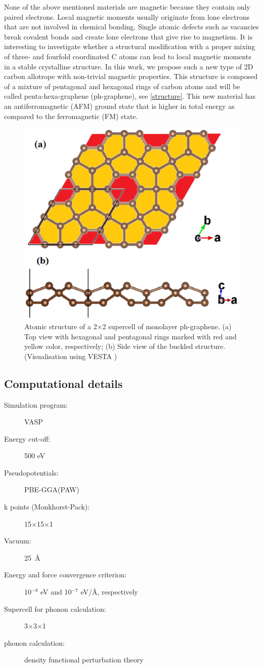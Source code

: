 None of the above mentioned materials are magnetic because they contain only paired electrons. Local magnetic moments usually originate from lone electrons that are not involved in chemical bonding. Single atomic defects such as vacancies break covalent bonds and create lone electrons that give rise to magnetism. It is interesting to investigate whether a structural modification with a proper mixing of three- and fourfold coordinated C atoms can lead to local magnetic moments in a stable crystalline structure.  In this work, we propose such a new type of 2D carbon allotrope with non-trivial magnetic properties. This structure is composed of a mixture of pentagonal and hexagonal rings of carbon atoms and will be called penta-hexa-graphene (ph-graphene), see \autoref{structure}. This new material has an antiferromagnetic (AFM) ground state that is higher in total energy as compared to the ferromagnetic (FM) state.

\begin{figure}[htbp]
\centering
\includegraphics[width=0.6\linewidth]{PG_structure.eps}%
\caption{ Atomic structure of a 2$\times$2 supercell of monolayer ph-graphene. (a) Top view with hexagonal and pentagonal rings marked with red and yellow color, respectively; (b) Side view of the buckled structure. \label{structure} (Visualisation using VESTA \cite{vesta})}
\end{figure}

\subsection{Computational details\label{comp}}
\begin{footnotesize}
\begin{description}
\item[Simulation program:] VASP
\item[Energy cut-off:] 500 eV
\item[Pseudopotentials:] PBE-GGA(PAW)
\item[k points (Monkhorst-Pack):] 15$\times$15$\times$1
\item[Vacuum:] 25~\AA
\item[Energy and force convergence criterion:] 10$^{-8}$ eV and 10$^{-7}$ eV/\AA, respectively
\item[Supercell for phonon calculation:] 3$\times$3$\times$1
\item[phonon calculation:] density functional perturbation theory
\end{description}
\end{footnotesize}


